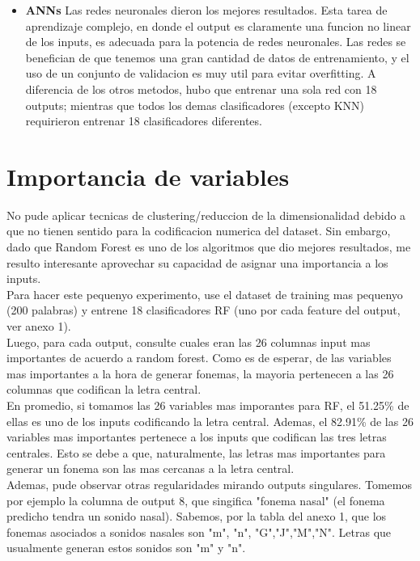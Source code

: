 \documentclass[paper=a4, fontsize=11pt]{scrartcl} %
\numberwithin{equation}{section} %
\numberwithin{figure}{section} %
\numberwithin{table}{section} %
\begin{document}
\begin{itemize}
\item \textbf{ANNs} Las redes neuronales dieron los mejores resultados. Esta tarea de aprendizaje complejo, en donde el output es claramente una funcion no linear de los inputs, es adecuada para la potencia de redes neuronales. Las redes se benefician de que tenemos una gran cantidad de datos de entrenamiento, y el uso de un conjunto de validacion es muy util para evitar overfitting. A diferencia de los otros metodos, hubo que entrenar una sola red con 18 outputs; mientras que todos los demas clasificadores (excepto KNN) requirieron entrenar 18 clasificadores diferentes.

\end{itemize}

\section{ Importancia de variables }

No pude aplicar tecnicas de clustering/reduccion de la dimensionalidad debido a que no tienen sentido para la codificacion numerica del dataset. Sin embargo, dado que Random Forest es uno de los algoritmos que dio mejores resultados, me resulto interesante aprovechar su capacidad de asignar una importancia a los inputs. \\

Para hacer este pequenyo experimento, use el dataset de training mas pequenyo (200 palabras) y entrene 18 clasificadores RF (uno por cada feature del output, ver anexo 1). \\

Luego, para cada output, consulte cuales eran las 26 columnas input mas importantes de acuerdo a random forest. Como es de esperar, de las variables mas importantes a la hora de generar fonemas, la mayoria pertenecen a las 26 columnas que codifican la letra central. \\

En promedio, si tomamos las 26 variables mas imporantes para RF, el 51.25\% de ellas es uno de los inputs codificando la letra central. Ademas, el 82.91\% de las 26 variables mas importantes pertenece a los inputs que codifican las tres letras centrales. Esto se debe a que, naturalmente, las letras mas importantes para generar un fonema son las mas cercanas a la letra central. \\ 

Ademas, pude observar otras regularidades mirando outputs singulares. Tomemos por ejemplo la columna de output 8, que singifica "fonema nasal" (el fonema predicho tendra un sonido nasal). Sabemos, por la tabla del anexo 1, que los fonemas asociados a sonidos nasales son "m", "n", "G","J","M","N". Letras que usualmente generan estos sonidos son "m" y "n". \\
\end{document}
